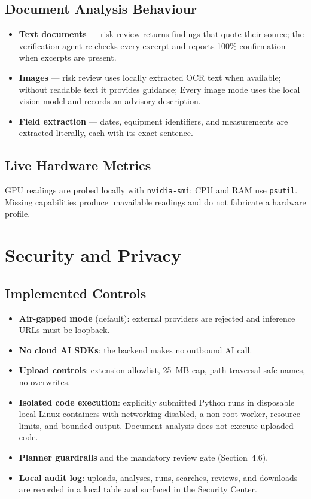 \documentclass[11pt,a4paper]{article}
\begin{document}
\subsection{Document Analysis Behaviour}
\begin{itemize}[leftmargin=1.4em]
  \item \textbf{Text documents} --- risk review returns findings that quote
        their source; the verification agent re-checks every excerpt and
        reports 100\% confirmation when excerpts are present.
  \item \textbf{Images} --- risk review uses locally extracted OCR text when available; without readable text it provides guidance; Every image mode uses the local vision model and records an
        advisory description.
  \item \textbf{Field extraction} --- dates, equipment identifiers, and
        measurements are extracted literally, each with its exact sentence.
\end{itemize}

\subsection{Live Hardware Metrics}
GPU readings are probed locally with \texttt{nvidia-smi}; CPU and RAM use \texttt{psutil}. Missing capabilities produce unavailable readings and do not fabricate a hardware profile.

\section{Security and Privacy}

\subsection{Implemented Controls}
\begin{itemize}[leftmargin=1.4em]
  \item \textbf{Air-gapped mode} (default): external providers are rejected
        and inference URLs must be loopback.
  \item \textbf{No cloud AI SDKs}: the backend makes no outbound AI call.
  \item \textbf{Upload controls}: extension allowlist, 25~MB cap,
        path-traversal-safe names, no overwrites.
  \item \textbf{Isolated code execution}: explicitly submitted Python runs in disposable local Linux containers with networking disabled, a non-root worker, resource limits, and bounded output. Document analysis does not execute uploaded code.
  \item \textbf{Planner guardrails} and the mandatory review gate
        (Section~4.6).
  \item \textbf{Local audit log}: uploads, analyses, runs, searches, reviews,
        and downloads are recorded in a local table and surfaced in the
        Security Center.
\end{itemize}
\end{document}
